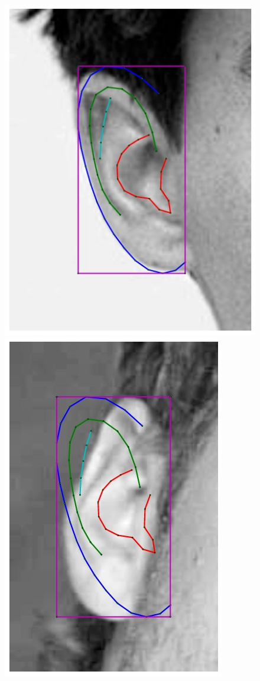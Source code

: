 \begin{figure}[!t]
    \includegraphics[height=\flowhh]{resources/Ear_Deformable_Model/fittings/initial_0020}
    \includegraphics[height=\flowhh]{resources/Ear_Deformable_Model/fittings/initial_0026}

\end{figure}
